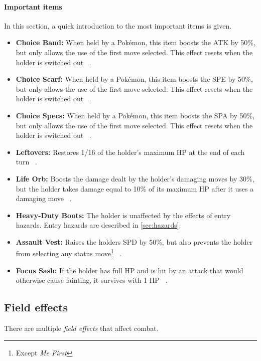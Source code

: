 \paragraph{Important items}
\label{sec:Important-items}
In this section, a quick introduction to the most important items is given.
\begin{itemize}
	\item \textbf{Choice Band:} When held by a Pokémon, this item boosts the \ac{ATK} by 50\%, but only
	allows the use of the first move selected. This effect resets when the holder is switched out ~\autocite{Bulbapedia:ChoiceBand}. 
	\item \textbf{Choice Scarf:} When held by a Pokémon, this item boosts the \ac{SPE} by 50\%, but only
	allows the use of the first move selected. This effect resets when the holder is switched out ~\autocite{Bulbapedia:ChoiceScarf}. 
	\item \textbf{Choice Specs:} When held by a Pokémon, this item boosts the \ac{SPA} by 50\%, but only
	allows the use of the first move selected. This effect resets when the holder is switched out ~\autocite{Bulbapedia:ChoiceSpecs}. 
	\item \textbf{Leftovers:} Restores 1/16 of the holder's maximum \ac{HP} at the end of each turn ~\autocite{Bulbapedia:Leftovers}.
	\item \textbf{Life Orb:} Boosts the damage dealt by the holder's damaging moves by 30\%, but the holder takes damage 
	equal to 10\% of its maximum \ac{HP} after it uses a damaging move ~\autocite{Bulbapedia:LifeOrb}.
	\item \textbf{Heavy-Duty Boots:} The holder is unaffected by the effects of entry hazards. Entry hazards are described 
	in \ref{sec:hazards}.
	\item \textbf{Assault Vest:} Raises the holders \ac{SPD} by 50\%, but also prevents the holder from selecting any 
	status move\footnote{Except \textit{Me First}} ~\autocite{Bulbapedia:AssaultVest}.
	\item \textbf{Focus Sash:} If the holder has full \ac{HP} and is hit by an attack that would otherwise cause fainting,
	it survives with 1 \ac{HP} ~\autocite{Bulbapedia:FocusSash}.
\end{itemize}

\subsection{Field effects}
\label{sec:field-effects}
There are multiple \textit{field effects} that affect combat.

